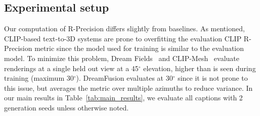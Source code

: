 \documentclass{article} %
\newcommand{\dreamfusion}{DreamFusion\xspace}
\begin{document}
\subsection{Experimental setup}
\label{sec:extra_evaluation_setup}

Our computation of R-Precision differs slightly from baselines. As mentioned, CLIP-based text-to-3D systems are prone to overfitting the evaluation CLIP R-Precision metric since the model used for training is similar to the evaluation model. To minimize this problem, Dream Fields~\citep{jain2021dreamfields} and CLIP-Mesh~\citep{clipmesh} evaluate renderings at a single held out view at a 45$^\circ$ elevation, higher than is seen during training (maximum 30$^\circ$). \dreamfusion evaluates at 30$^\circ$ since it is not prone to this issue, but averages the metric over multiple azimuths to reduce variance. In our main results in Table~\ref{tab:main_results}, we evaluate all captions with 2 generation seeds unless otherwise noted.
\end{document}

